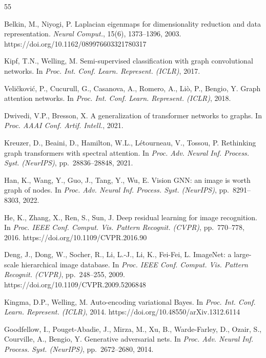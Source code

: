 \documentclass[lettersize,journal]{IEEEtran}
\begin{document}
\begin{thebibliography}{55}

Belkin, M., Niyogi, P. Laplacian eigenmaps for dimensionality reduction and data representation. \textit{Neural Comput.}, 15(6), 1373--1396, 2003. https://doi.org/10.1162/089976603321780317

Kipf, T.N., Welling, M. Semi-supervised classification with graph convolutional networks. In \textit{Proc. Int. Conf. Learn. Represent. (ICLR)}, 2017.

Veli\v{c}kovi\'{c}, P., Cucurull, G., Casanova, A., Romero, A., Li\`{o}, P., Bengio, Y. Graph attention networks. In \textit{Proc. Int. Conf. Learn. Represent. (ICLR)}, 2018.

Dwivedi, V.P., Bresson, X. A generalization of transformer networks to graphs. In \textit{Proc. AAAI Conf. Artif. Intell.}, 2021.

Kreuzer, D., Beaini, D., Hamilton, W.L., L\'{e}tourneau, V., Tossou, P. Rethinking graph transformers with spectral attention. In \textit{Proc. Adv. Neural Inf. Process. Syst. (NeurIPS)}, pp.~28836--28848, 2021.

Han, K., Wang, Y., Guo, J., Tang, Y., Wu, E. Vision GNN: an image is worth graph of nodes. In \textit{Proc. Adv. Neural Inf. Process. Syst. (NeurIPS)}, pp.~8291--8303, 2022.


He, K., Zhang, X., Ren, S., Sun, J. Deep residual learning for image recognition. In \textit{Proc. IEEE Conf. Comput. Vis. Pattern Recognit. (CVPR)}, pp.~770--778, 2016. https://doi.org/10.1109/CVPR.2016.90

Deng, J., Dong, W., Socher, R., Li, L.-J., Li, K., Fei-Fei, L. ImageNet: a large-scale hierarchical image database. In \textit{Proc. IEEE Conf. Comput. Vis. Pattern Recognit. (CVPR)}, pp.~248--255, 2009. https://doi.org/10.1109/CVPR.2009.5206848

Kingma, D.P., Welling, M. Auto-encoding variational Bayes. In \textit{Proc. Int. Conf. Learn. Represent. (ICLR)}, 2014. https://doi.org/10.48550/arXiv.1312.6114

Goodfellow, I., Pouget-Abadie, J., Mirza, M., Xu, B., Warde-Farley, D., Ozair, S., Courville, A., Bengio, Y. Generative adversarial nets. In \textit{Proc. Adv. Neural Inf. Process. Syst. (NeurIPS)}, pp.~2672--2680, 2014.


\end{thebibliography}
\end{document}
